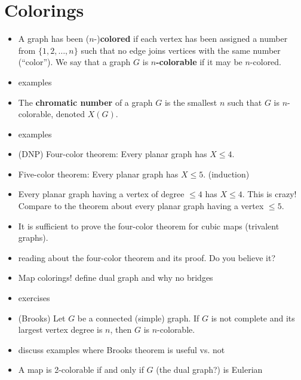 \section{Colorings}\label{sec:colorings}

\begin{itemize}
    \item A graph has been ($n$-)\textbf{colored} if each vertex has been assigned a number from $\{1, 2, \ldots, n\}$ such that no edge joins vertices with the same number (``color'').  We say that a graph $G$ is \textbf{$n$-colorable} if it may be $n$-colored.
    \item examples
    \item The \textbf{chromatic number} of a graph $G$ is the smallest $n$ such that $G$ is $n$-colorable, denoted $X(G)$.
    \item examples
    \item (DNP) Four-color theorem: Every planar graph has $X \leq 4$.
    \item Five-color theorem: Every planar graph has $X \leq 5$. (induction)
    \item Every planar graph having a vertex of degree $\leq 4$ has $X\leq 4$.  This is crazy!  Compare to the theorem about every planar graph having a vertex $\leq 5$. %
    \item It is sufficient to prove the four-color theorem for cubic maps (trivalent graphs).
    \item reading about the four-color theorem and its proof.  Do you believe it?
    \item Map colorings!  define dual graph and why no bridges
    \item exercises
    \item (Brooks) Let $G$ be a connected (simple) graph.  If $G$ is not complete and its largest vertex degree is $n$, then $G$ is $n$-colorable. %
    \item discuss examples where Brooks theorem is useful vs. not
    \item A map is 2-colorable if and only if $G$ (the dual graph?) is Eulerian
\end{itemize}
